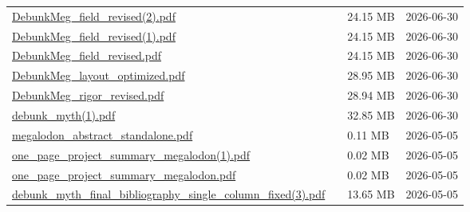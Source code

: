 \documentclass[UTF8,fontset=fandol,10pt,a4paper]{ctexart}
\begin{document}
\begin{longtable}{@{}L{\dimexpr\linewidth-50mm-6\tabcolsep\relax}R{8mm}R{16mm}R{26mm}@{}}
\href{https://chatgpt.com/library?file_id=libfile_f3c03b7e92fc8191bfc3696eebe1d0a1&account_id=personal}{DebunkMeg\_\allowbreak{}field\_\allowbreak{}revised(2).\allowbreak{}pdf} & \textemdash{} & 24.15 MB & 2026-06-30 \\
\href{https://chatgpt.com/library?file_id=libfile_1625bae6e2888191a80e675df6d25f09&account_id=personal}{DebunkMeg\_\allowbreak{}field\_\allowbreak{}revised(1).\allowbreak{}pdf} & \textemdash{} & 24.15 MB & 2026-06-30 \\
\href{https://chatgpt.com/library?file_id=libfile_24e15a25e4e08191a067940f036fb59f&account_id=personal}{DebunkMeg\_\allowbreak{}field\_\allowbreak{}revised.\allowbreak{}pdf} & \textemdash{} & 24.15 MB & 2026-06-30 \\
\href{https://chatgpt.com/library?file_id=libfile_0a22b3dc77e08191841def6a6b8add17&account_id=personal}{DebunkMeg\_\allowbreak{}layout\_\allowbreak{}optimized.\allowbreak{}pdf} & \textemdash{} & 28.95 MB & 2026-06-30 \\
\href{https://chatgpt.com/library?file_id=libfile_161fdb1741a0819182d1f7b01ec46500&account_id=personal}{DebunkMeg\_\allowbreak{}rigor\_\allowbreak{}revised.\allowbreak{}pdf} & \textemdash{} & 28.94 MB & 2026-06-30 \\
\href{https://chatgpt.com/library?file_id=libfile_8b52177e429c81919ea1178159709d06&account_id=personal}{debunk\_\allowbreak{}myth(1).\allowbreak{}pdf} & \textemdash{} & 32.85 MB & 2026-06-30 \\
\href{https://chatgpt.com/library?file_id=libfile_4f4476384d8c8191b6001e91a0c3fcaf&account_id=personal}{megalodon\_\allowbreak{}abstract\_\allowbreak{}standalone.\allowbreak{}pdf} & \textemdash{} & 0.11 MB & 2026-05-05 \\
\href{https://chatgpt.com/library?file_id=libfile_5bc86f734ec8819187f87751ae8a818b&account_id=personal}{one\_\allowbreak{}page\_\allowbreak{}project\_\allowbreak{}summary\_\allowbreak{}megalodon(1).\allowbreak{}pdf} & \textemdash{} & 0.02 MB & 2026-05-05 \\
\href{https://chatgpt.com/library?file_id=libfile_a7c4c52814388191b71bf4283894bcac&account_id=personal}{one\_\allowbreak{}page\_\allowbreak{}project\_\allowbreak{}summary\_\allowbreak{}megalodon.\allowbreak{}pdf} & \textemdash{} & 0.02 MB & 2026-05-05 \\
\href{https://chatgpt.com/library?file_id=libfile_2b13f07b25288191a4308866f9d986bc&account_id=personal}{debunk\_\allowbreak{}myth\_\allowbreak{}final\_\allowbreak{}bibliography\_\allowbreak{}single\_\allowbreak{}column\_\allowbreak{}fixed(3).\allowbreak{}pdf} & \textemdash{} & 13.65 MB & 2026-05-05 \\

\end{longtable}
\end{document}
